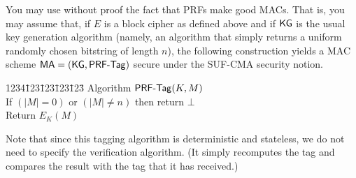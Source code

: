 \documentclass{exam}
\begin{document}
\noindent You may use without proof the fact that PRFs make good MACs. That is, you may assume that, if $E$ is a block cipher as defined above and if $\mathsf{KG}$ is the usual key generation algorithm (namely, an algorithm that simply returns a uniform randomly chosen bitstring of length $n$), the following construction yields a MAC scheme $\mathsf{MA} = (\mathsf{KG},\mathsf{PRF}\mbox{-}\mathsf{Tag})$ secure under the SUF-CMA security notion.
  \begin{tabbing}
    1234\=123\=123\=123\=123\=\kill
    Algorithm $\mathsf{PRF}\mbox{-}\mathsf{Tag}(K,M)$ \\
    \> If $(|M| = 0)$ or $(|M| \neq n)$ then return $\bot$ \\
    \> Return $E_K(M)$
  \end{tabbing}
  Note that since this tagging algorithm is deterministic and stateless, we do not need to specify the verification algorithm. (It simply recomputes the tag and compares the result with the tag that it has received.)

  \newpage
  
\end{document}
